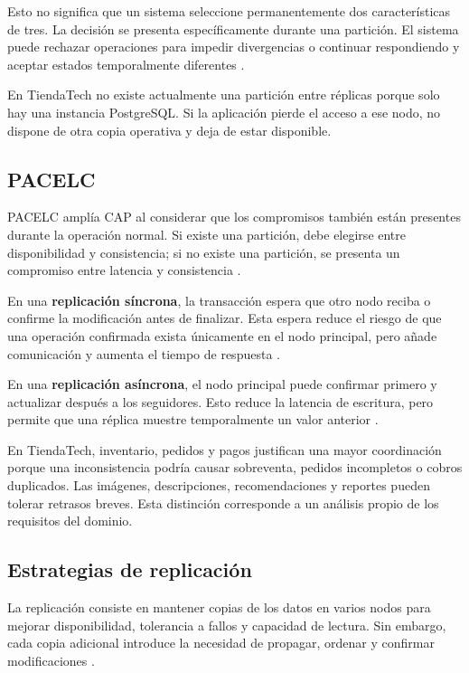 \documentclass[11pt,a4paper]{article}
\begin{document}
Esto no significa que un sistema seleccione permanentemente dos características de tres. La decisión se presenta específicamente durante una partición. El sistema puede rechazar operaciones para impedir divergencias o continuar respondiendo y aceptar estados temporalmente diferentes \cite{gilbert2002}.

En TiendaTech no existe actualmente una partición entre réplicas porque solo hay una instancia PostgreSQL. Si la aplicación pierde el acceso a ese nodo, no dispone de otra copia operativa y deja de estar disponible.

\subsection{PACELC}
PACELC amplía CAP al considerar que los compromisos también están presentes durante la operación normal. Si existe una partición, debe elegirse entre disponibilidad y consistencia; si no existe una partición, se presenta un compromiso entre latencia y consistencia \cite{abadi2012}.

En una \textbf{replicación síncrona}, la transacción espera que otro nodo reciba o confirme la modificación antes de finalizar. Esta espera reduce el riesgo de que una operación confirmada exista únicamente en el nodo principal, pero añade comunicación y aumenta el tiempo de respuesta \cite{abadi2012,margara2023}.

En una \textbf{replicación asíncrona}, el nodo principal puede confirmar primero y actualizar después a los seguidores. Esto reduce la latencia de escritura, pero permite que una réplica muestre temporalmente un valor anterior \cite{abadi2012,margara2023}.

En TiendaTech, inventario, pedidos y pagos justifican una mayor coordinación porque una inconsistencia podría causar sobreventa, pedidos incompletos o cobros duplicados. Las imágenes, descripciones, recomendaciones y reportes pueden tolerar retrasos breves. Esta distinción corresponde a un análisis propio de los requisitos del dominio.

\subsection{Estrategias de replicación}
La replicación consiste en mantener copias de los datos en varios nodos para mejorar disponibilidad, tolerancia a fallos y capacidad de lectura. Sin embargo, cada copia adicional introduce la necesidad de propagar, ordenar y confirmar modificaciones \cite{margara2023}.
\end{document}
